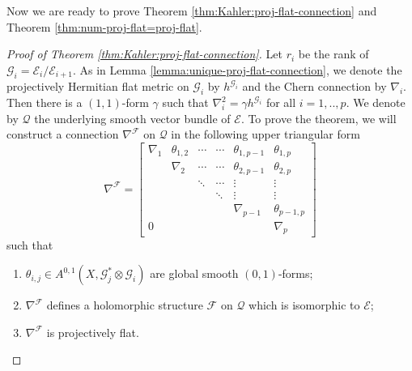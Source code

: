 \documentclass[english,reqno]{amsart}
\newcommand\sE{{\mathscr E}}
\newcommand\sF{{\mathscr F}}
\newcommand\sG{{\mathscr G}}
\newcommand\sQ{{\mathscr Q}}
\newcommand\bp{{\bar\partial}}
\theoremstyle{plain}
\theoremstyle{definition}
\numberwithin{equation}{section} %
\begin{document}
Now we are ready to prove Theorem \ref{thm:Kahler:proj-flat-connection} and  Theorem \ref{thm:num-proj-flat=proj-flat}.

\begin{proof}[Proof of Theorem \ref{thm:Kahler:proj-flat-connection}]
    Let $r_i$ be the rank of $\sG_i = \sE_i/\sE_{i+1} $.
    As in Lemma \ref{lemma:unique-proj-flat-connection}, we denote the projectively Hermitian  flat metric on $\sG_i$ by $h^{\sG_i}$ and the Chern connection  by $\nabla_i$.
    Then there is a $(1,1)$-form $\gamma$  such that $\nabla_i^2=\gamma h^{\sG_i}$ for all $i=1,..,p$.
    We denote by $\sQ$ the underlying smooth vector bundle of $\sE$.
    To prove the theorem, we will construct a connection $\nabla^{\sF}$ on $\sQ$ in the following upper triangular form
    \[
    \nabla^{\sF} =
    \begin{bmatrix}
    \nabla_1 & \theta_{1,2} & \cdots & \cdots & \theta_{1,p-1} & \theta_{1,p} \\
    & \nabla_2  & \cdots & \cdots& \theta_{2,p-1} & \theta_{2,p} \\
    & &\ddots & \cdots & \vdots & \vdots \\
    & & & \ddots & \vdots & \vdots \\
    & & & & \nabla_{p-1} & \theta_{p-1,p} \\
    0 & & & & & \nabla_p
    \end{bmatrix}
    \]
    such that
    \begin{enumerate}
        \item $\theta_{i,j} \in A^{0,1}(X,\sG_j^* \otimes \sG_i)$  are   global smooth $(0,1)$-forms;
        \item $\nabla^\sF$ defines a holomorphic structure $\sF$ on $\sQ$ which is isomorphic to $\sE$;
        \item $\nabla^\sF$ is projectively flat.
    \end{enumerate}


\end{proof}
\end{document}
